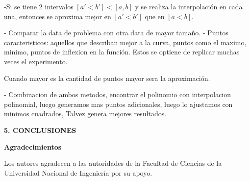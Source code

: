 \documentclass[10pt,a4paper]{article}
\begin{document}
\begin{multicols}{2}
		
		-Si se tiene 2 intervalos $[a' < b'] < [a , b] $ y se realiza la interpolación en cada una, entonces se aproxima mejor en $[a'< b']$ que en $[a < b]$.
		
		- Comparar la data de problema con otra data de mayor tamaño.
		- Puntos caracteristicos: aquellos que describan mejor a la curva, puntos como el maximo, minimo, puntos de inflexion en la función. Estos se optiene de replicar muchas veces el experimento.
		
		Cuando mayor es la cantidad de puntos mayor sera la aproximación.
		
		- Combinacion de ambos metodos, encontrar el polinomio con interpolacion polinomial, luego generamos mas puntos adicionales, luego lo ajustamos con minimos cuadrados, Talvez genera mejores resultados.
		
		
		
		\begin{center}
			{\large \bf 5. CONCLUSIONES}
		\end{center}
		
		\begin{center}
			{\large \bf Agradecimientos}
		\end{center}
		Los autores agradecen a las autoridades de la Facultad de Ciencias de la Universidad Nacional de 
		Ingenier\'{\i}a por su apoyo.
		
	\end{multicols}
	\newpage
	
\end{document}
